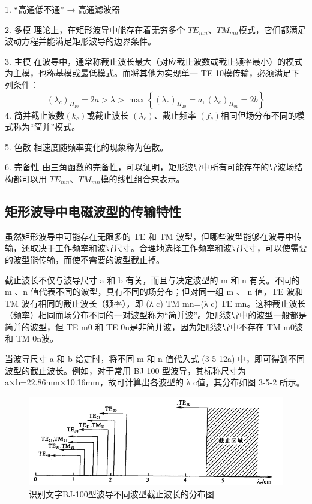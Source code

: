 1. “高通低不通”
→ 高通滤波器

2. 多模
理论上，在矩形波导中能存在着无穷多个 $TE_{mn} $、$ TM_{mn} $模式，它们都满足波动方程并能满足矩形波导的边界条件。

3. 主模
在波导中，通常称截止波长最大（对应截止波数或截止频率最小）的模式为主模，也称基模或最低模式。而将其他为实现单一 TE 10​模传输，必须满足下列条件：
\[
(\lambda_c)_{H_{10}} = 2a > \lambda > \max \left\{ (\lambda_c)_{H_{20}} = a, (\lambda_c)_{H_{01}} = 2b \right\}
\tag{3-4}
\]
4. 简并截止波数$ ( k_c )$或截止波长 $( \lambda_c )$、截止频率 $( f_c )$相同但场分布不同的模式称为“简并”模式。

5. 色散
相速度随频率变化的现象称为色散。

6. 完备性
由三角函数的完备性，可以证明，矩形波导中所有可能存在的导波场结构都可以用 $TE_{mn} $、$ TM_{mn} $模的线性组合来表示。

\subsection{矩形波导中电磁波型的传输特性}
虽然矩形波导中可能存在无限多的 TE 和 TM 波型，但哪些波型能够在波导中传输，还取决于工作频率和波导尺寸。合理地选择工作频率和波导尺寸，可以使需要的波型能传输，而使不需要的波型截止掉。


截止波长不仅与波导尺寸 a 和 b 有关，而且与决定波型的 m 和 n 有关。不同的 m 、n 值代表不同的波型，具有不同的场分布；但对同一组 m 、 n 值，TE 波和 TM 波有相同的截止波长（频率），即 (λ c​) TM mn​=(λ c​) TE mn​。这种截止波长（频率）相同而场分布不同的一对波型称为“简并波”。矩形波导中的波型一般都是简并的波型，但 TE m0
​和 TE 0n​是非简并波，因为矩形波导中不存在 TM m0​波和 TM 0n​波。

当波导尺寸 a 和 b 给定时，将不同 m 和 n 值代入式 (3-5-12a) 中，即可得到不同波型的截止波长。例如，对于常用 BJ-100 型波导，其标称尺寸为 a×b=22.86mm×10.16mm，故可计算出各波型的 λ c​值，其分布如图 3-5-2 所示。



\begin{figure}[htbp]
	\centering
	\includegraphics[width=0.7\linewidth]{img/3-6}
	\caption{识别文字BJ-100型波导不同波型截止波长的分布图}
	\label{fig:3-6}
\end{figure}

